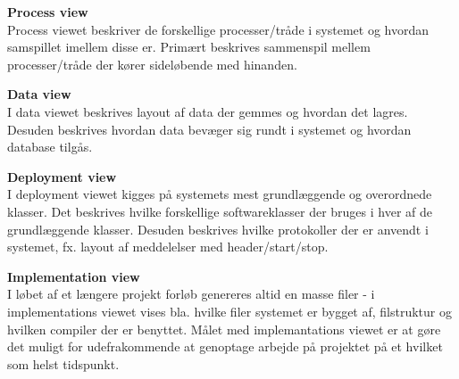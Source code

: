 \textbf{Process view}\\
Process viewet beskriver de forskellige processer/tråde i systemet og hvordan samspillet imellem disse er. Primært beskrives sammenspil mellem processer/tråde der kører sideløbende med hinanden.

\textbf{Data view}\\
I data viewet beskrives layout af data der gemmes og hvordan det lagres. Desuden beskrives hvordan data bevæger sig rundt i systemet og hvordan database tilgås. 

\textbf{Deployment view}\\
I deployment viewet kigges på systemets mest grundlæggende og overordnede klasser. Det beskrives hvilke forskellige softwareklasser der bruges i hver af de grundlæggende klasser. Desuden beskrives hvilke protokoller der er anvendt i systemet, fx. layout af meddelelser med header/start/stop.   

\textbf{Implementation view}\\
I løbet af et længere projekt forløb genereres altid en masse filer - i implementations viewet vises bla. hvilke filer systemet er bygget af, filstruktur og hvilken compiler der er benyttet. 
Målet med implemantations viewet er at gøre det muligt for udefrakommende at genoptage arbejde på projektet på et hvilket som helst tidspunkt.


